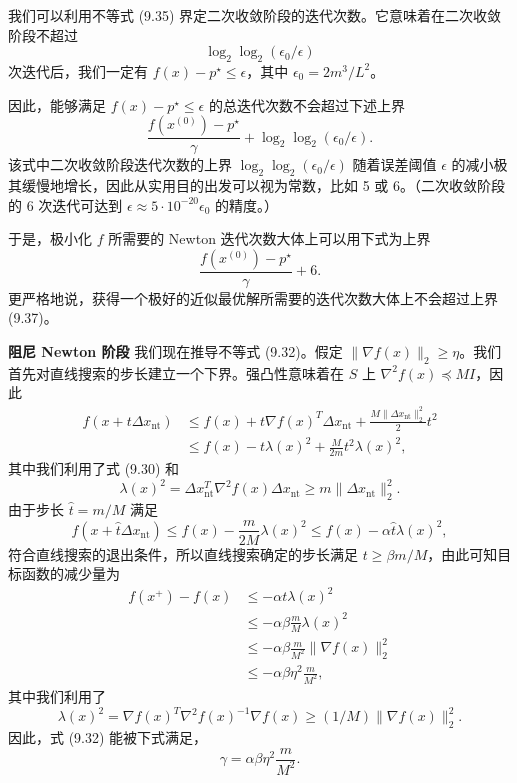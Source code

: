 \documentclass[UTF8, 12pt, fontset=fandol, oneside]{ctexart}
\begin{document}
我们可以利用不等式 (9.35) 界定二次收敛阶段的迭代次数。它意味着在二次收敛阶段不超过
\[
\log_2\log_2(\epsilon_0/\epsilon)
\]
次迭代后，我们一定有 $f(x)-p^\star\leq\epsilon$，其中 $\epsilon_0=2m^3/L^2$。

因此，能够满足 $f(x)-p^\star\leq\epsilon$ 的总迭代次数不会超过下述上界
\begin{equation}
\frac{f(x^{(0)})-p^\star}{\gamma}+\log_2\log_2(\epsilon_0/\epsilon).
\tag{9.36}
\end{equation}
该式中二次收敛阶段迭代次数的上界 $\log_2\log_2(\epsilon_0/\epsilon)$ 随着误差阈值 $\epsilon$ 的减小极其缓慢地增长，因此从实用目的出发可以视为常数，比如 5 或 6。（二次收敛阶段的 6 次迭代可达到 $\epsilon\approx5\cdot10^{-20}\epsilon_0$ 的精度。）

于是，极小化 $f$ 所需要的 Newton 迭代次数大体上可以用下式为上界
\begin{equation}
\frac{f(x^{(0)})-p^\star}{\gamma}+6.
\tag{9.37}
\end{equation}
更严格地说，获得一个极好的近似最优解所需要的迭代次数大体上不会超过上界 (9.37)。

\noindent\textbf{阻尼 Newton 阶段}\quad
我们现在推导不等式 (9.32)。假定 $\|\nabla f(x)\|_2\geq\eta$。我们首先对直线搜索的步长建立一个下界。强凸性意味着在 $S$ 上 $\nabla^2f(x)\preceq MI$，因此
\[
\begin{aligned}
f(x+t\Delta x_{\mathrm{nt}})
&\leq f(x)+t\nabla f(x)^T\Delta x_{\mathrm{nt}}+\frac{M\|\Delta x_{\mathrm{nt}}\|_2^2}{2}t^2\\
&\leq f(x)-t\lambda(x)^2+\frac{M}{2m}t^2\lambda(x)^2,
\end{aligned}
\]
其中我们利用了式 (9.30) 和
\[
\lambda(x)^2=\Delta x_{\mathrm{nt}}^T\nabla^2f(x)\Delta x_{\mathrm{nt}}\geq m\|\Delta x_{\mathrm{nt}}\|_2^2.
\]
由于步长 $\hat{t}=m/M$ 满足
\[
f(x+\hat{t}\Delta x_{\mathrm{nt}})\leq f(x)-\frac{m}{2M}\lambda(x)^2\leq f(x)-\alpha\hat{t}\lambda(x)^2,
\]
符合直线搜索的退出条件，所以直线搜索确定的步长满足 $t\geq\beta m/M$，由此可知目标函数的减少量为
\[
\begin{aligned}
f(x^+)-f(x)
&\leq -\alpha t\lambda(x)^2\\
&\leq -\alpha\beta\frac{m}{M}\lambda(x)^2\\
&\leq -\alpha\beta\frac{m}{M^2}\|\nabla f(x)\|_2^2\\
&\leq -\alpha\beta\eta^2\frac{m}{M^2},
\end{aligned}
\]
其中我们利用了
\[
\lambda(x)^2=\nabla f(x)^T\nabla^2f(x)^{-1}\nabla f(x)\geq(1/M)\|\nabla f(x)\|_2^2.
\]
因此，式 (9.32) 能被下式满足，
\begin{equation}
\gamma=\alpha\beta\eta^2\frac{m}{M^2}.
\tag{9.38}
\end{equation}
\end{document}
